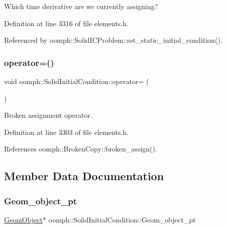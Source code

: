 Which time derivative are we currently assigning? 



Definition at line 3316 of file elements.\+h.



Referenced by oomph\+::\+Solid\+I\+C\+Problem\+::set\+\_\+static\+\_\+initial\+\_\+condition().

\mbox{\label{classoomph_1_1SolidInitialCondition_ab746fd596b28c65865a9349b08ca5d6b}} 
\subsubsection{\texorpdfstring{operator=()}{operator=()}}
{\footnotesize\ttfamily void oomph\+::\+Solid\+Initial\+Condition\+::operator= (\begin{DoxyParamCaption}\item[{const \hyperlink{classoomph_1_1SolidInitialCondition}{Solid\+Initial\+Condition} \&}]{ }\end{DoxyParamCaption})\hspace{0.3cm}{\ttfamily [inline]}}



Broken assignment operator. 



Definition at line 3303 of file elements.\+h.



References oomph\+::\+Broken\+Copy\+::broken\+\_\+assign().



\subsection{Member Data Documentation}
\mbox{\label{classoomph_1_1SolidInitialCondition_ab88fd7c7d57d8d340a012b277a12128f}} 
\subsubsection{\texorpdfstring{Geom\+\_\+object\+\_\+pt}{Geom\_object\_pt}}
{\footnotesize\ttfamily \hyperlink{classoomph_1_1GeomObject}{Geom\+Object}$\ast$ oomph\+::\+Solid\+Initial\+Condition\+::\+Geom\+\_\+object\+\_\+pt\hspace{0.3cm}{\ttfamily [private]}}



